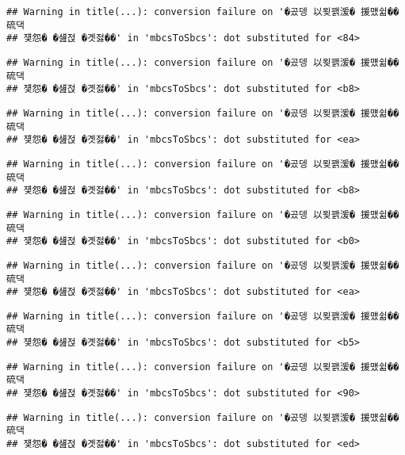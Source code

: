 \documentclass[
]{article}
\begin{document}
\begin{verbatim}
## Warning in title(...): conversion failure on '�곴뎅 以묒꽭湲� 援먰쉶�� 硫댁
## 쟻怨� �섎젅 �곗젏��' in 'mbcsToSbcs': dot substituted for <84>
\end{verbatim}

\begin{verbatim}
## Warning in title(...): conversion failure on '�곴뎅 以묒꽭湲� 援먰쉶�� 硫댁
## 쟻怨� �섎젅 �곗젏��' in 'mbcsToSbcs': dot substituted for <b8>
\end{verbatim}

\begin{verbatim}
## Warning in title(...): conversion failure on '�곴뎅 以묒꽭湲� 援먰쉶�� 硫댁
## 쟻怨� �섎젅 �곗젏��' in 'mbcsToSbcs': dot substituted for <ea>
\end{verbatim}

\begin{verbatim}
## Warning in title(...): conversion failure on '�곴뎅 以묒꽭湲� 援먰쉶�� 硫댁
## 쟻怨� �섎젅 �곗젏��' in 'mbcsToSbcs': dot substituted for <b8>
\end{verbatim}

\begin{verbatim}
## Warning in title(...): conversion failure on '�곴뎅 以묒꽭湲� 援먰쉶�� 硫댁
## 쟻怨� �섎젅 �곗젏��' in 'mbcsToSbcs': dot substituted for <b0>
\end{verbatim}

\begin{verbatim}
## Warning in title(...): conversion failure on '�곴뎅 以묒꽭湲� 援먰쉶�� 硫댁
## 쟻怨� �섎젅 �곗젏��' in 'mbcsToSbcs': dot substituted for <ea>
\end{verbatim}

\begin{verbatim}
## Warning in title(...): conversion failure on '�곴뎅 以묒꽭湲� 援먰쉶�� 硫댁
## 쟻怨� �섎젅 �곗젏��' in 'mbcsToSbcs': dot substituted for <b5>
\end{verbatim}

\begin{verbatim}
## Warning in title(...): conversion failure on '�곴뎅 以묒꽭湲� 援먰쉶�� 硫댁
## 쟻怨� �섎젅 �곗젏��' in 'mbcsToSbcs': dot substituted for <90>
\end{verbatim}

\begin{verbatim}
## Warning in title(...): conversion failure on '�곴뎅 以묒꽭湲� 援먰쉶�� 硫댁
## 쟻怨� �섎젅 �곗젏��' in 'mbcsToSbcs': dot substituted for <ed>
\end{verbatim}
\end{document}
